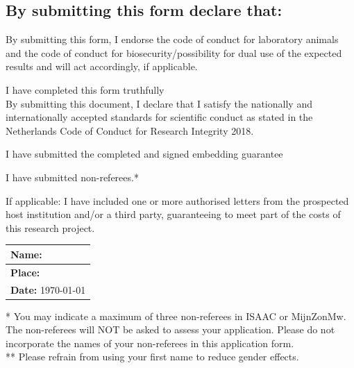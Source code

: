 \documentclass[10pt]{article}
\newcommand{\cmark}{$\checkmark$}%
\newcommand{\done}{\rlap{\color{sectionblue}$\square$}{\raisebox{2pt}{\large\hspace{1pt}\cmark}}\hspace{-2.5pt}}
\newcommand{\tableheadfont}{\bfseries\fontsize{10}{10}\selectfont\leavevmode\color{tableblue}}
\begin{document}
	\subsection*{By submitting this form  declare that:}
    By submitting this form, I endorse the code of conduct for laboratory animals and the code of conduct for biosecurity/possibility for dual use of the expected results and will act accordingly, if applicable.
    \begin{todolist}
	\item[\done] I have completed this form truthfully\\By submitting this document, I declare that I satisfy the nationally and internationally accepted standards for scientific conduct as stated in the Netherlands Code of Conduct for Research Integrity 2018.
	\item[\done] I have submitted the completed and signed embedding guarantee
	\item[\done] I have submitted non-referees.*
	\item[\done] If applicable: I have included one or more authorised letters from the prospected host institution and/or a third party, guaranteeing to meet part of the costs of this research project.
    \end{todolist}
\begin{tabularx}{\linewidth}{|X|}
		\arrayrulecolor{sectionblue}\hline
{\tableheadfont Name:} \\\hline
{\tableheadfont Place:} \\\hline
{\tableheadfont Date:} \today\\\hline
\end{tabularx}
* You may indicate a maximum of three non-referees  in ISAAC or MijnZonMw. The non-referees will NOT be asked to assess your application. Please do not incorporate the names of your non-referees in this application form.\\
** Please refrain from using your first name to reduce gender effects.
\end{document}
